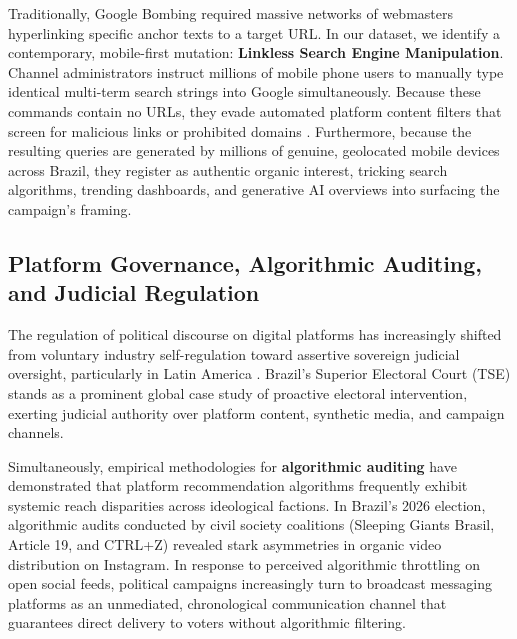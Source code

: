 \documentclass[preprint,12pt]{elsarticle}
\begin{document}
Traditionally, Google Bombing required massive networks of webmasters hyperlinking specific anchor texts to a target URL. In our dataset, we identify a contemporary, mobile-first mutation: \textbf{Linkless Search Engine Manipulation}. Channel administrators instruct millions of mobile phone users to manually type identical multi-term search strings into Google simultaneously. Because these commands contain no URLs, they evade automated platform content filters that screen for malicious links or prohibited domains \cite{gillespie2018custodians}. Furthermore, because the resulting queries are generated by millions of genuine, geolocated mobile devices across Brazil, they register as authentic organic interest, tricking search algorithms, trending dashboards, and generative AI overviews into surfacing the campaign's framing.

\subsection{Platform Governance, Algorithmic Auditing, and Judicial Regulation}
The regulation of political discourse on digital platforms has increasingly shifted from voluntary industry self-regulation toward assertive sovereign judicial oversight, particularly in Latin America \cite{gillespie2018custodians,evangelista2019whatsapp}. Brazil's Superior Electoral Court (TSE) stands as a prominent global case study of proactive electoral intervention, exerting judicial authority over platform content, synthetic media, and campaign channels.

Simultaneously, empirical methodologies for \textbf{algorithmic auditing} \cite{hortaribeiro2020auditing} have demonstrated that platform recommendation algorithms frequently exhibit systemic reach disparities across ideological factions. In Brazil's 2026 election, algorithmic audits conducted by civil society coalitions (Sleeping Giants Brasil, Article 19, and CTRL+Z) \cite{sleepinggiants2026nikolas} revealed stark asymmetries in organic video distribution on Instagram. In response to perceived algorithmic throttling on open social feeds, political campaigns increasingly turn to broadcast messaging platforms as an unmediated, chronological communication channel that guarantees direct delivery to voters without algorithmic filtering.

\end{document}
